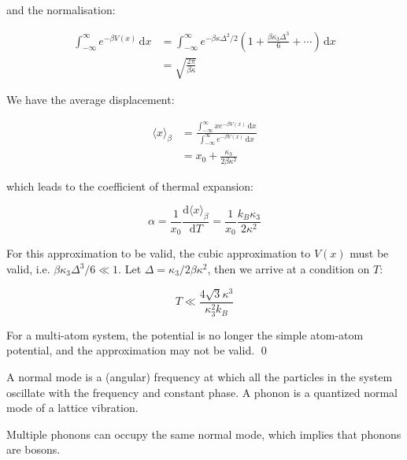 \documentclass[12pt]{article}
\begin{document}
and the normalisation:

\begin{equation}
    \begin{split}
        \int_{-\infty}^{\infty} e^{-\beta V(x)} \, \mathrm{d}x &= \int_{-\infty}^{\infty} e^{-\beta \kappa \Delta^{2}/2} \left( 1 + \frac{\beta \kappa_{3} \Delta^{3}}{6} + \cdots \right) \, \mathrm{d}x \\
        &= \sqrt{\frac{2\pi}{\beta \kappa}}
    \end{split}
\end{equation}

We have the average displacement:

\begin{equation}
    \begin{split}
        \langle x \rangle_{\beta} &= \frac{\int_{-\infty}^{\infty} x e^{-\beta V(x)} \, \mathrm{d}x}{\int_{-\infty}^{\infty} e^{-\beta V(x)} \, \mathrm{d}x} \\
        &= x_{0} + \frac{\kappa_{3}}{2\beta \kappa^{2}}
    \end{split}
\end{equation}

which leads to the coefficient of thermal expansion:

\begin{equation}
    \alpha = \frac{1}{x_{0}} \frac{\mathrm{d}\langle x \rangle_{\beta}}{\mathrm{d}T} = \frac{1}{x_{0}} \frac{k_{B}\kappa_{3}}{2\kappa^{2}}
\end{equation}

For this approximation to be valid, the cubic approximation to $V(x)$ must be valid, i.e. $\beta \kappa_{3} \Delta^{3}/6 \ll 1$. Let $\Delta = \kappa_{3}/2\beta \kappa^{2}$, then we arrive at a condition on $T$:

\begin{equation}
    T \ll \frac{4\sqrt{3} \kappa^{3}}{\kappa_{3}^{2} k_{B}}
\end{equation}

For a multi-atom system, the potential is no longer the simple atom-atom potential, and the approximation may not be valid.
\qed




A normal mode is a (angular) frequency at which all the particles in the system oscillate with the frequency and constant phase. A phonon is a quantized normal mode of a lattice vibration.

Multiple phonons can occupy the same normal mode, which implies that phonons are bosons.
\end{document}
